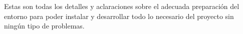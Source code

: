 \documentclass[a4paper, 12pt]{book}
\begin{document}
Estas son todas los detalles y aclaraciones sobre el adecuada preparación del entorno para poder instalar y desarrollar todo lo necesario del proyecto sin ningún tipo de problemas.


\glsaddall
\printglossary[type=\acronymtype,nonumberlist]

\printglossary





\cleardoublepage

%
% 

\raggedright\printbibliography[heading=bibintoc,title={Referencias}]
\end{document}
